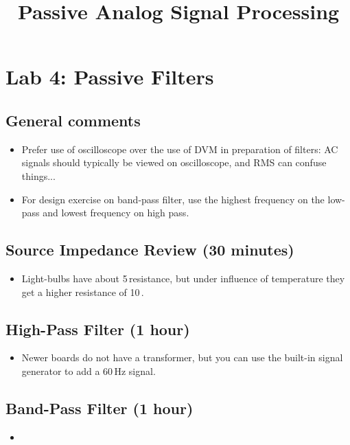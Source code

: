\documentclass{article}
\title{Passive Analog Signal Processing}
\begin{document}
\maketitle

\section{Lab 4: Passive Filters}

\subsection*{General comments}

\begin{itemize}
\item Prefer use of oscilloscope over the use of DVM in preparation of filters: AC signals should typically be viewed on oscilloscope, and RMS can confuse things...
\item For design exercise on band-pass filter, use the highest frequency on the low-pass and lowest frequency on high pass.
\end{itemize}

\subsection{Source Impedance Review (30 minutes)}
\begin{itemize}
\item Light-bulbs have about 5\,\Ohm resistance, but under influence of temperature they get a higher resistance of 10\,\Ohm.
\end{itemize}

\subsection{High-Pass Filter (1 hour)}
\begin{itemize}
\item Newer boards do not have a transformer, but you can use the built-in signal generator to add a 60\,Hz signal.
\end{itemize}

\subsection{Band-Pass Filter (1 hour)}
\begin{itemize}
\item 
\end{itemize}
\end{document}
